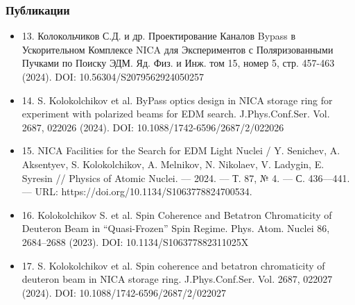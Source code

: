 \begin{frame}
	\frametitle{Публикации}
	\small
	\begin{itemize}
	\item	13. Колокольчиков С.Д. и др. Проектирование Каналов Bypass в Ускорительном Комплексе NICA для Экспериментов с Поляризованными Пучками по Поиску ЭДМ. Яд. Физ. и Инж. том 15, номер 5, стр. 457-463 (2024). DOI: 10.56304/S2079562924050257
	\item	14. S. Kolokolchikov et al. ByPass optics design in NICA storage ring for experiment with polarized beams for EDM search. J.Phys.Conf.Ser. Vol. 2687, 022026 (2024). DOI: 10.1088/1742-6596/2687/2/022026
	\item	15. NICA Facilities for the Search for EDM Light Nuclei / Y. Senichev, A. Aksentyev, S. Kolokolchikov, A. Melnikov, N. Nikolaev, V. Ladygin, E. Syresin // Physics of Atomic Nuclei. –– 2024. –– Т. 87, № 4. –– С. 436––441. –– URL: https://doi.org/10.1134/S1063778824700534.
	\item	16. Kolokolchikov S. et al. Spin Coherence and Betatron Chromaticity of Deuteron Beam in “Quasi-Frozen” Spin Regime. Phys. Atom. Nuclei 86, 2684–2688 (2023). DOI: 10.1134/S106377882311025X
	\item	17. S. Kolokolchikov et al. Spin coherence and betatron chromaticity of deuteron beam in NICA storage ring. J.Phys.Conf.Ser. Vol. 2687, 022027 (2024). DOI: 10.1088/1742-6596/2687/2/022027
	
	\end{itemize}
\end{frame}
